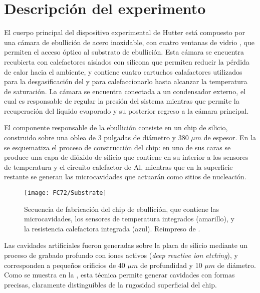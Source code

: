 



\section{Descripci\'on del experimento}

El cuerpo principal del dispositivo experimental de Hutter \cite{hutter_experimental_2010} est\'a compuesto por una c\'amara de ebullici\'on de acero inoxidable, con cuatro ventanas de vidrio , que permiten el acceso \'optico al substrato de ebullici\'on. Esta c\'amara se encuentra recubierta con calefactores aislados con silicona que permiten reducir la p\'erdida de calor hacia el ambiente, y contiene cuatro cartuchos calafactores utilizados para la desgasificaci\'on del  y para calefaccionarlo hasta alcanzar la temperatura de saturaci\'on. La c\'amara se encuentra conectada a un condensador externo, el cual es responsable de regular la presi\'on del sistema mientras que permite la recuperaci\'on del l\'iquido evaporado y su posterior regreso a la c\'amara principal.

El componente responsable de la ebullici\'on consiste en un chip de silicio, construido sobre una oblea de 3 pulgadas de di\'ametro y 380 $\mu m$ de espesor. En la  se esquematiza el proceso de construcci\'on del chip: en uno de sus caras se produce una capa de di\'oxido de silicio que contiene en su interior a los sensores de temperatura y el circuito calefactor de Al, mientras que en la superficie restante se generan las microcavidades que actuar\'an como sitios de nucleaci\'on.

\begin{figure}[ht]
	\centering
	\texttt{[image: FC72/Substrate]}
	\caption{Secuencia de fabricaci\'on del chip de ebullici\'on, que contiene las microcavidades, los sensores de temperatura integrados (amarillo), y la resistencia calefactora integrada (azul). Reimpreso de \cite{hutter_experimental_2010}.}
	\label{fig:chip}
\end{figure}

Las cavidades artificiales fueron generadas sobre la placa de silicio mediante un proceso de grabado profundo con iones activos (\emph{deep reactive ion etching}), y corresponden a peque\~nos orificios de 40 $\mu m$ de profundidad y 10 $\mu m$ de di\'ametro. Como se muestra en la , esta t\'ecnica permite generar cavidades con formas precisas, claramente distinguibles de la rugosidad superficial del chip.

